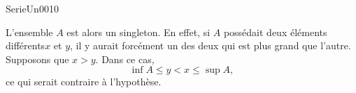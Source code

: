 

\begin{corrige}{SerieUn0010}

	L'ensemble $A$ est alors un singleton. En effet, si $A$ possédait deux éléments différents$x$ et $y$, il y aurait forcément un des deux qui est plus grand que l'autre. Supposons que $x>y$. Dans ce cas,
	\begin{equation}
		\inf A\leq y<x\leq\sup A,
	\end{equation}
	ce qui serait contraire à l'hypothèse.

\end{corrige}
